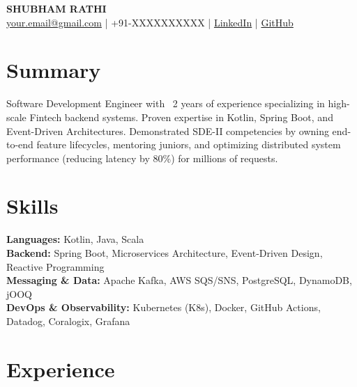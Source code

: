 \documentclass[a4paper,10pt]{article}
\begin{document}
\begin{center}
    {\Large \textbf{SHUBHAM RATHI}} \\
    \small
    \href{mailto:your.email@gmail.com}{your.email@gmail.com} \;|\;
    +91-XXXXXXXXXX \;|\;
    \href{https://linkedin.com/in/ishubhamrathi }{LinkedIn} \;|\;
    \href{https://github.com/ishubhanmrathi }{GitHub}
\end{center}

\section*{Summary}
Software Development Engineer with ~2 years of experience specializing in high-scale Fintech backend systems. Proven expertise in Kotlin, Spring Boot, and Event-Driven Architectures. Demonstrated SDE-II competencies by owning end-to-end feature lifecycles, mentoring juniors, and optimizing distributed system performance (reducing latency by 80\%) for millions of requests.

\section*{Skills}
\textbf{Languages:} Kotlin, Java, Scala \\
\textbf{Backend:} Spring Boot, Microservices Architecture, Event-Driven Design, Reactive Programming \\
\textbf{Messaging \& Data:} Apache Kafka, AWS SQS/SNS, PostgreSQL, DynamoDB, jOOQ \\
\textbf{DevOps \& Observability:} Kubernetes (K8s), Docker, GitHub Actions, Datadog, Coralogix, Grafana

\section*{Experience}
\end{document}
